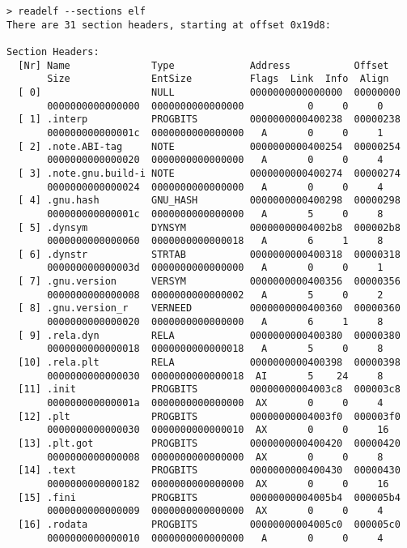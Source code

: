 \documentclass{article}
\begin{document}
\begin{lstlisting}
> readelf --sections elf
There are 31 section headers, starting at offset 0x19d8:

Section Headers:
  [Nr] Name              Type             Address           Offset
       Size              EntSize          Flags  Link  Info  Align
  [ 0]                   NULL             0000000000000000  00000000
       0000000000000000  0000000000000000           0     0     0
  [ 1] .interp           PROGBITS         0000000000400238  00000238
       000000000000001c  0000000000000000   A       0     0     1
  [ 2] .note.ABI-tag     NOTE             0000000000400254  00000254
       0000000000000020  0000000000000000   A       0     0     4
  [ 3] .note.gnu.build-i NOTE             0000000000400274  00000274
       0000000000000024  0000000000000000   A       0     0     4
  [ 4] .gnu.hash         GNU_HASH         0000000000400298  00000298
       000000000000001c  0000000000000000   A       5     0     8
  [ 5] .dynsym           DYNSYM           00000000004002b8  000002b8
       0000000000000060  0000000000000018   A       6     1     8
  [ 6] .dynstr           STRTAB           0000000000400318  00000318
       000000000000003d  0000000000000000   A       0     0     1
  [ 7] .gnu.version      VERSYM           0000000000400356  00000356
       0000000000000008  0000000000000002   A       5     0     2
  [ 8] .gnu.version_r    VERNEED          0000000000400360  00000360
       0000000000000020  0000000000000000   A       6     1     8
  [ 9] .rela.dyn         RELA             0000000000400380  00000380
       0000000000000018  0000000000000018   A       5     0     8
  [10] .rela.plt         RELA             0000000000400398  00000398
       0000000000000030  0000000000000018  AI       5    24     8
  [11] .init             PROGBITS         00000000004003c8  000003c8
       000000000000001a  0000000000000000  AX       0     0     4
  [12] .plt              PROGBITS         00000000004003f0  000003f0
       0000000000000030  0000000000000010  AX       0     0     16
  [13] .plt.got          PROGBITS         0000000000400420  00000420
       0000000000000008  0000000000000000  AX       0     0     8
  [14] .text             PROGBITS         0000000000400430  00000430
       0000000000000182  0000000000000000  AX       0     0     16
  [15] .fini             PROGBITS         00000000004005b4  000005b4
       0000000000000009  0000000000000000  AX       0     0     4
  [16] .rodata           PROGBITS         00000000004005c0  000005c0
       0000000000000010  0000000000000000   A       0     0     4

\end{lstlisting}
\end{document}
